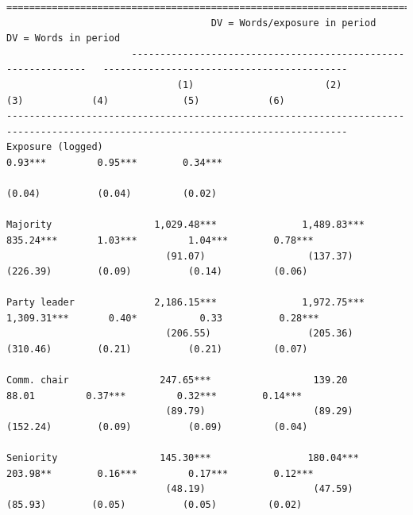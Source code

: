 \documentclass[letter,12pt]{article}
\begin{document}
\begin{table} \centering 
  \begin{tiny}
    \begin{verbatim}
==================================================================================================================================
                                    DV = Words/exposure in period                                  DV = Words in period               
                      --------------------------------------------------------------   -------------------------------------------
                              (1)                       (2)                 (3)            (4)             (5)            (6)     
----------------------------------------------------------------------------------------------------------------------------------
Exposure (logged)                                                                        0.93***         0.95***        0.34***   
                                                                                         (0.04)          (0.04)         (0.02)    
                                                                                                                                  
Majority                  1,029.48***               1,489.83***          835.24***       1.03***         1.04***        0.78***   
                            (91.07)                  (137.37)            (226.39)        (0.09)          (0.14)         (0.06)    
                                                                                                                                  
Party leader              2,186.15***               1,972.75***         1,309.31***       0.40*           0.33          0.28***   
                            (206.55)                 (205.36)            (310.46)        (0.21)          (0.21)         (0.07)    
                                                                                                                                  
Comm. chair                247.65***                  139.20               88.01         0.37***         0.32***        0.14***   
                            (89.79)                   (89.29)            (152.24)        (0.09)          (0.09)         (0.04)    
                                                                                                                                  
Seniority                  145.30***                 180.04***           203.98**        0.16***         0.17***        0.12***   
                            (48.19)                   (47.59)             (85.93)        (0.05)          (0.05)         (0.02)    
                                                                                                                                  

\end{verbatim}
\end{tiny}
\end{table}
\end{document}

